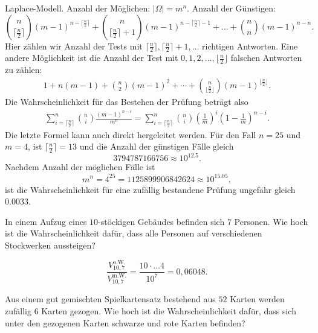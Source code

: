 \solution Laplace-Modell. Anzahl der Möglichen: $| \Omega| = m^n$. 
Anzahl der Günstigen:
\begin{equation*}
    \binom{n}{ \lceil\frac{n}{2}\rceil }(m-1)^{n - \lceil\frac{n}{2}\rceil } +
    \binom{n}{   \lceil\frac{n}{2}\rceil +1 }(m-1)^{n -   \lceil\frac{n}{2}\rceil-1   } + \dots +
    \binom{n}{n} (m-1)^{n-n}. 
\end{equation*}
Hier zählen wir Anzahl der Tests mit $\lceil \frac{n}{2} \rceil, \lceil \frac{n}{2} \rceil +1,\dots $ richtigen
Antworten. Eine andere Möglichkeit ist die Anzahl der Test mit $0,1,2,\dots , \lfloor \frac{n}{2} \rfloor$ falschen
Antworten zu zählen:
\begin{align*}
    1 + n(m-1) + \binom{n}{2}(m-1)^{2} + \cdots + \binom{n}{ \lfloor \frac{n}{2} \rfloor } (m-1)^{\lfloor \frac{n}{2} \rfloor }.
\end{align*}
Die Wahrscheinlichkeit für das Bestehen der Prüfung beträgt also
\begin{align*}
    \sum_{i=\lceil \frac{n}{2} \rceil}^{n} \binom{n}{i} \frac{ \left( m-1 \right)^{n-i}  }{ m^n } = 
    \sum_{i=\lceil \frac{n}{2} \rceil}^{n} \binom{n}{i} \left( \frac{1}{m} \right)^{i} \left( 1-\frac{1}{m} \right)^{n-i}.
\end{align*}
Die letzte Formel kann auch direkt hergeleitet werden. 
Für den Fall $n=25$ und $m=4$, ist $\lceil \frac{n}{2} \rceil = 13$ und die Anzahl 
der günstigen Fälle gleich 
\begin{equation*}
    3794787166756 \approx 10^{12.5}.
\end{equation*}
Nachdem Anzahl der möglichen Fälle ist 
\begin{equation*}
    m^{n} = 4^{25} = 1125899906842624 \approx 10^{15.05},
\end{equation*}
ist die Wahrscheinlichkeit für eine zufällig bestandene Prüfung ungefähr gleich
$0.0033$.


 In einem Aufzug eines $10$-stöckigen Gebäudes
befinden sich $7$ Personen. Wie hoch ist die Wahrscheinlichkeit dafür, dass
alle Personen auf verschiedenen Stockwerken aussteigen?

\solution
\begin{equation*}
    \frac{V^{\text{o.W.}}_{10,7}}{V^{\text{m.W.}}_{10,7}} = \frac{10\cdot \dots 4}{10^{7}} = 0,06048.
\end{equation*}

 Aus einem gut gemischten
Spielkartensatz bestehend aus $52$ Karten werden zufällig $6$ Karten gezogen.
Wie hoch ist die Wahrscheinlichkeit dafür, dass sich unter den gezogenen Karten
schwarze und rote Karten befinden?

